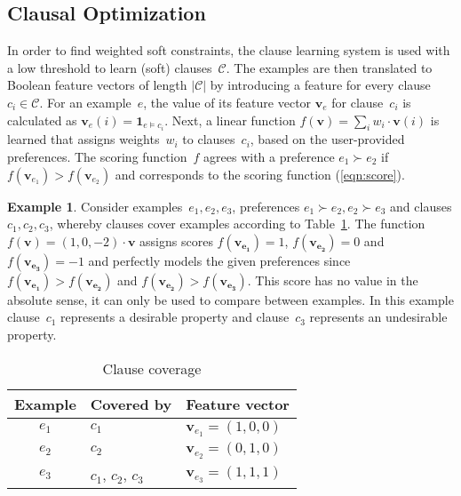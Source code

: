 \documentclass[letterpaper]{article}
\newcommand{\sym}[1]{\ensuremath{\mathcal{#1}}}
\theoremstyle{definition}
\newtheorem{example}{Example}
\newcommand{\abs}[1]{\left|#1\right|}
\begin{document}
\subsection{Clausal Optimization}
In order to find weighted soft constraints, the clause learning system is used with a low threshold to learn (soft) clauses~\sym{C}.
The examples are then translated to Boolean feature vectors of length $\abs{\sym{C}}$ by introducing a feature for every clause~$c_i \in \sym{C}$.
For an example~$e$, the value of its feature vector $\mathbf{v}_e$ for clause~$c_i$ is calculated as $\mathbf{v}_e(i) = \mathbf{1}_{e \models c_i}$.
Next, a linear function $f(\mathbf{v})=\sum_i w_i \cdot \mathbf{v}(i)$ is learned that assigns weights~$w_i$ to clauses~$c_i$, based on the user-provided preferences.
The scoring function~$f$ agrees with a preference $e_1 \succ e_2$ if $f(\mathbf{v}_{e_1}) > f(\mathbf{v}_{e_2})$ and corresponds to the scoring function (\ref{eqn:score}).

\begin{example}
  \label{ex:features}
  Consider examples~$e_1, e_2, e_3$, preferences $e_1 \succ e_2, e_2 \succ e_3$ and clauses $c_1, c_2, c_3$, whereby clauses cover examples according to Table~\ref{tbl:cover_examples}.
  The function $f(\mathbf{v}) = (1, 0, -2) \cdot \mathbf{v}$ assigns scores $f(\mathbf{v_{e_1}}) = 1$, $f(\mathbf{v_{e_2}}) = 0$ and $f(\mathbf{v_{e_3}}) = -1$ and perfectly models the given preferences since $f(\mathbf{v_{e_1}}) > f(\mathbf{v_{e_2}})$ and $f(\mathbf{v_{e_2}}) > f(\mathbf{v_{e_3}})$.
  This score has no value in the absolute sense, it can only be used to compare between examples.
  In this example clause~$c_1$ represents a desirable property and clause~$c_3$ represents an undesirable property.

  \begin{table}
  \caption{Clause coverage}
  \label{tbl:cover_examples}
  \begin{tabularx}{\linewidth}{c|l|X}
    \textbf{Example} & \textbf{Covered by} & \textbf{Feature vector}\\
    \toprule
    $e_1$             & $c_1$               & $\mathbf{v}_{e_1} = (1, 0, 0)$ \\
    $e_2$             & $c_2$               & $\mathbf{v}_{e_2} = (0, 1, 0)$ \\
    $e_3$             & $c_1$, $c_2$, $c_3$ & $\mathbf{v}_{e_3} = (1, 1, 1)$ \\
  \end{tabularx}
  \end{table}
\end{example}
\end{document}
